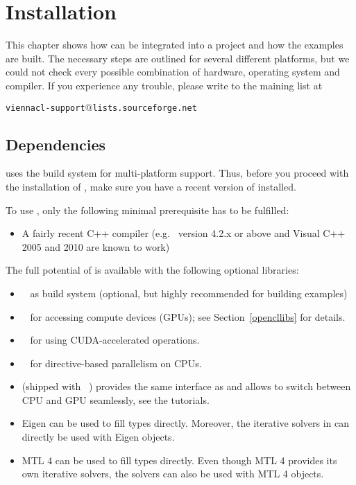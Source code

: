 \chapter{Installation}

This chapter shows how {\ViennaCL} can be integrated into a project and how the
examples are built. The necessary steps are outlined for several different
platforms, but we could not check every possible combination of hardware,
operating system and compiler. If you experience any trouble, please write to
the maining list at \\
\begin{center}
\texttt{viennacl-support$@$lists.sourceforge.net} 
\end{center}


\section{Dependencies}
\label{dependencies}
{\ViennaCL} uses the {\CMake} build system for multi-platform support.
Thus, before you proceed with the installation of {\ViennaCL}, make sure you
have a recent version of {\CMake} installed.

To use {\ViennaCL}, only the following minimal prerequisite has to be fulfilled:
\begin{itemize}
 \item A fairly recent C++ compiler (e.g.~{\GCC} version 4.2.x or above and Visual C++
2005 and 2010 are known to work)
\end{itemize}


The full potential of {\ViennaCL} is available with the following optional libraries:
\begin{itemize}
 \item {\CMake}~\cite{cmake} as build system (optional, but highly recommended for building examples)
 \item {\OpenCL}~\cite{khronoscl,nvidiacl} for accessing compute devices (GPUs); see Section~\ref{opencllibs} for details.
 \item {\CUDA}~\cite{nvidiacuda} for using CUDA-accelerated operations.
 \item {\OpenMP}~\cite{openmp} for directive-based parallelism on CPUs.
 \item {\ublas} (shipped with {\Boost}~\cite{boost}) provides the same interface as {\ViennaCL} and allows to switch between CPU and GPU seamlessly, see the tutorials.
 \item Eigen \cite{eigen} can be used to fill {\ViennaCL} types directly. Moreover, the iterative solvers in {\ViennaCL} can directly be used with Eigen objects.
 \item MTL 4 \cite{mtl4} can be used to fill {\ViennaCL} types directly. Even though MTL 4 provides its own iterative solvers, the {\ViennaCL} solvers can also be used with MTL 4 objects.
\end{itemize}

